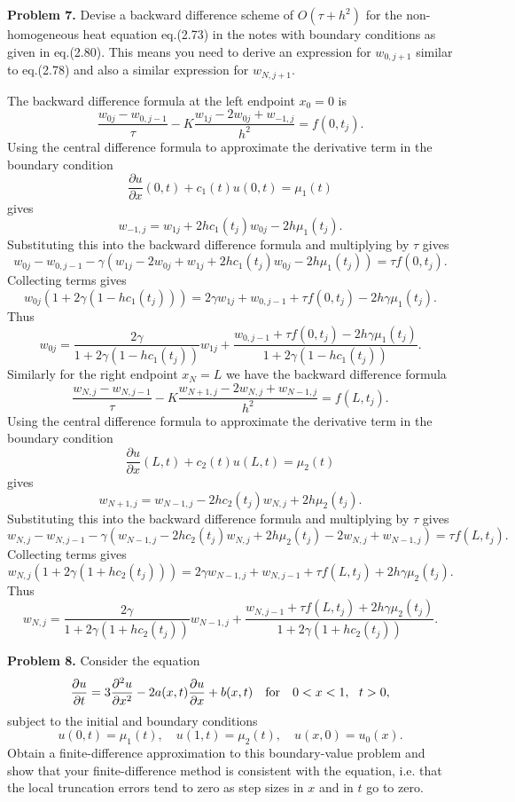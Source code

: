 \documentclass[10pt]{article}
\def\pr{{\partial}}
\begin{document}




\vskip 0.5cm
\noindent
{\bf Problem 7.}
Devise a backward difference scheme of $O(\tau+h^2)$ for the non-homogeneous heat
equation eq.(2.73) in the notes with boundary conditions as given in eq.(2.80). This means
you need to derive an expression for $w_{0,j+1}$ similar to eq.(2.78) and also a similar
expression for $w_{N,j+1}$.


\vskip 0.5cm 
The backward difference formula at the left endpoint $x_0=0$ is
\[
\frac{w_{0j}-w_{0,j-1}}{\tau}-K\frac{w_{1j}-2w_{0j}+w_{-1,j}}{h^2}=f(0,t_j).
\]
Using the central difference formula to approximate the derivative term in the boundary condition
\[
\frac{\pr u}{\pr x}(0,t)+c_{1}(t)u(0,t)=\mu_{1}(t)
\]
gives
\[w_{-1,j}=w_{1j}+2hc_1(t_j)w_{0j}-2h\mu_1(t_j).
\]
Substituting this into the backward difference formula and multiplying by $\tau$ gives
\[
w_{0j}-w_{0,j-1}-\gamma\left(w_{1j}-2w_{0j}+w_{1j}+2hc_1(t_j)w_{0j}-2h\mu_1(t_j)\right)=\tau f(0,t_j).
\]
Collecting terms gives
\[
w_{0j}\left(1+2\gamma(1-hc_1(t_j))\right)=2\gamma w_{1j}+w_{0,j-1}+\tau f(0,t_j)-2h\gamma\mu_1(t_j).
\]
Thus
\[
w_{0j} = \frac{2\gamma}{1+2\gamma(1-hc_1(t_j))} w_{1j}
+\frac{w_{0,j-1}+\tau f(0,t_j)-2h\gamma\mu_1(t_j)}{1+2\gamma(1-hc_1(t_j))}.
\]
Similarly for the right endpoint $x_N=L$ we have the backward difference formula
\[
\frac{w_{N,j}-w_{N,j-1}}{\tau}-K\frac{w_{N+1,j}-2w_{N,j}+w_{N-1,j}}{h^2}=f(L,t_j).
\]
Using the central difference formula to approximate the derivative term in the boundary condition
\[
\frac{\pr u}{\pr x}(L,t)+c_{2}(t)u(L,t)=\mu_{2}(t)
\]
gives
\[w_{N+1,j}=w_{N-1,j}-2hc_2(t_j)w_{N,j}+2h\mu_2(t_j).
\]
Substituting this into the backward difference formula and multiplying by $\tau$ gives
\[
w_{N,j}-w_{N,j-1}-\gamma\left(w_{N-1,j}-2hc_2(t_j)w_{N,j}+2h\mu_2(t_j)-2w_{N,j}+w_{N-1,j}\right)=\tau f(L,t_j).
\]
Collecting terms gives
\[
w_{N,j}\left(1+2\gamma(1+hc_2(t_j))\right)=2\gamma w_{N-1,j}+w_{N,j-1}+\tau f(L,t_j)+2h\gamma\mu_2(t_j).
\]
Thus
\[
w_{N,j} = \frac{2\gamma}{1+2\gamma(1+hc_2(t_j))} w_{N-1,j}
+\frac{w_{N,j-1}+\tau f(L,t_j)+2h\gamma\mu_2(t_j)}{1+2\gamma(1+hc_2(t_j))}.
\]



\vskip 0.5cm
\noindent
{\bf Problem 8.}
Consider the equation
\[
\frac{\partial u}{\partial t}=3\frac{\partial^{2}u}{\partial x^{2}}-
2a(x,t)\frac{\partial u}{\partial x}+b(x,t) \quad \hbox{for} \quad
0<x<1, \ \ t > 0,
\]
subject to the initial and boundary conditions
\[
u(0,t)=\mu_{1}(t), \quad u(1, t)=\mu_{2}(t),
\quad u(x, 0)=u_{0}(x) .
\]
Obtain a finite-difference approximation to this boundary-value
problem and show that your finite-difference method is consistent
with the equation, i.e. that the local truncation errors tend to
zero as step sizes in $x$ and in $t$ go to zero.
\end{document}
